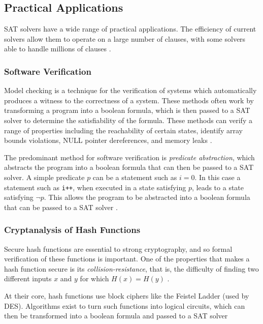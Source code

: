 \documentclass[conference]{IEEEtran}
\begin{document}
\subsection{Practical Applications}
SAT solvers have a wide range of practical applications. The efficiency of current solvers allow them to operate on a large number of clauses, with some solvers able to handle millions of clauses \cite{marques2008handbook}.

\subsubsection{Software Verification}
Model checking is a technique for the verification of systems which automatically produces a witness to the correctness of a system. These methods often work by transforming a program into a boolean formula, which is then passed to a SAT solver to determine the satisfiability of the formula. These methods can verify a range of properties including the reachability of certain states, identify array bounds violations, NULL pointer dereferences, and memory leaks \cite{ivancic2008efficient}.

The predominant method for software verification is \emph{predicate abstraction}, which abstracts the program into a boolean formula that can then be passed to a SAT solver. A simple predicate \(p\) can be a statement such as \(i=0\). In this case a statement such as \texttt{i++}, when executed in a state satisfying \(p\), leads to a state satisfying \(\neg p\). This allows the program to be abstracted into a boolean formula that can be passed to a SAT solver \cite{biere2009handbook}.

\subsubsection{Cryptanalysis of Hash Functions}
Secure hash functions are essential to strong cryptography, and so formal verification of these functions is important. One of the properties that makes a hash function secure is its \emph{collision-resistance}, that is, the difficulty of finding two different inputs \(x\) and \(y\) for which \(H(x) = H(y)\) \cite{mirnov2006applications}.

At their core, hash functions use block ciphers like the Feistel Ladder (used by DES). Algorithms exist to turn such functions into logical circuits, which can then be transformed into a boolean formula and passed to a SAT solver \cite{mirnov2006applications}
\end{document}
